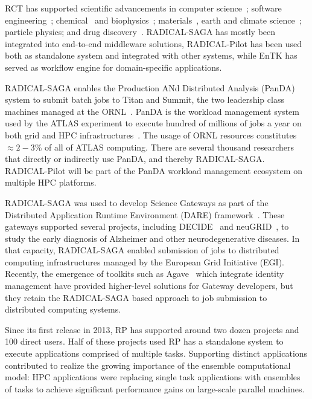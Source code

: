 \documentclass[preprint,12pt, a4paper]{elsarticle}
\begin{document}

RCT has supported scientific advancements in computer
science~\cite{merzky2018synapse}; software
engineering~\cite{turilli2019middleware}; chemical~\cite{sampat2018parallel}
and biophysics~\cite{shkurti2016coco,dakka2018high};
materials~\cite{dakka2018high}, earth and climate
science~\cite{paraskevakos2019workflow,balasubramanian2018harnessing};
particle physics\cite{oleynik2017high}; and drug
discovery~\cite{bfe-jctc-2014}. RADICAL-SAGA has mostly been integrated into
end-to-end middleware solutions, RADICAL-Pilot has been used both as
standalone system and integrated with other systems, while EnTK has served as
workflow engine for domain-specific applications.

RADICAL-SAGA enables the Production ANd Distributed Analysis (PanDA) system to
submit batch jobs to Titan and Summit, the two leadership class machines
managed at the ORNL~\cite{web-olcf-resources}. PanDA is the workload
management system used by the ATLAS experiment to execute hundred of millions
of jobs a year on both grid and HPC infrastructures~\cite{maeno2008panda}. The
usage of ORNL resources constitutes $\approx 2-3$\% of all of ATLAS computing.
There are several thousand researchers that directly or indirectly use PanDA,
and thereby RADICAL-SAGA. RADICAL-Pilot will be part of the PanDA workload
management ecosystem on multiple HPC platforms.


 RADICAL-SAGA was
used to develop Science Gateways as part of the Distributed Application
Runtime Environment (DARE) framework~\cite{maddineni2012distributed}. These
gateways supported several projects, including DECIDE~\cite{decide} and
neuGRID~\cite{redolfi2009grid}, to study the early diagnosis of Alzheimer and
other neurodegenerative diseases. In that capacity, RADICAL-SAGA enabled
submission of jobs to distributed computing infrastructures managed by the
European Grid Initiative (EGI). Recently, the emergence of toolkits such as
Agave~\cite{dooley2012software} which integrate identity management have
provided higher-level solutions for Gateway developers, but they retain the
RADICAL-SAGA based approach to job submission to distributed computing
systems.

Since its first release in 2013, RP has supported around two dozen projects
and 100 direct users. Half of these projects used RP has a standalone system
to execute applications comprised of multiple tasks. Supporting distinct
applications contributed to realize the growing importance of the
ensemble computational model: HPC applications were replacing single task
applications with ensembles of tasks to achieve significant performance gains
on large-scale parallel machines.
\end{document}
